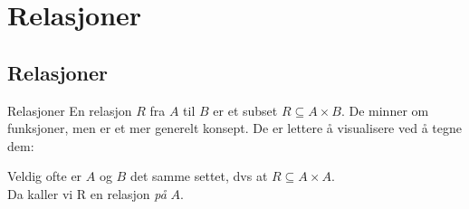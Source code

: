 \section{Relasjoner}
\subsection{Relasjoner}
\begin{frame}[fragile]{Relasjoner}
    En relasjon $R$ fra $A$ til $B$ er et subset $ R \subseteq A \times B$. De minner om funksjoner, men er et mer generelt konsept. De er lettere å visualisere ved å tegne dem:
    \begin{figure}
        \centering
        \qquad
        \qquad
        \qquad
        \label{fig:relasjoner}
    \end{figure} 

    \pause
    Veldig ofte er $A$ og $B$ det samme settet, dvs at $R \subseteq A \times A$.\\ 
    Da kaller vi R en relasjon \emph{på} $A$.
\end{frame}

